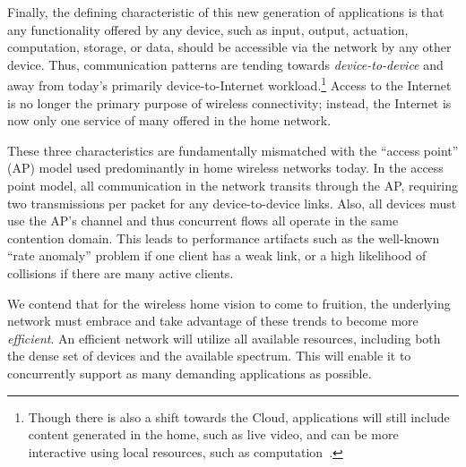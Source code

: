 Finally, the defining characteristic of this new generation of applications is that any functionality offered by any device, such as input, output, actuation, computation, storage, or data, should be accessible via the network by any other device. Thus, communication patterns are tending towards \emph{device-to-device} and away from today's primarily device-to-Internet workload.\footnote{Though there is also a shift towards the Cloud, applications will still include content generated in the home, such as live video, and can be more interactive using local resources, such as computation~\cite{satya_cloudlets}.} Access to the Internet is no longer the primary purpose of wireless connectivity; instead, the Internet is now only one service of many offered in the home network. 

These three characteristics are fundamentally mismatched with the ``access point'' (AP) model used predominantly in home wireless networks today.
In the access point model, all communication in the network transits through the AP\@, requiring two transmissions per packet for any device-to-device links.
Also, all devices must use the AP's channel and thus concurrent flows all operate in the same contention domain. This leads to performance artifacts such as the well-known ``rate anomaly'' problem if one client has a weak link, or a high likelihood of collisions if there are many active clients.

 
We contend that for the wireless home vision to come to fruition, the underlying network must embrace and take advantage of these trends to become more \emph{efficient}. An efficient network will utilize all available resources, including both the dense set of devices and the available spectrum. This will enable it to concurrently support as many demanding applications as possible.

